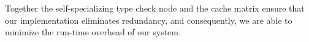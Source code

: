 Together the self-specializing type check node and the cache matrix 
ensure that our implementation eliminates redundancy, and
consequently, we are able to minimize the run-time overhead of our system. 



